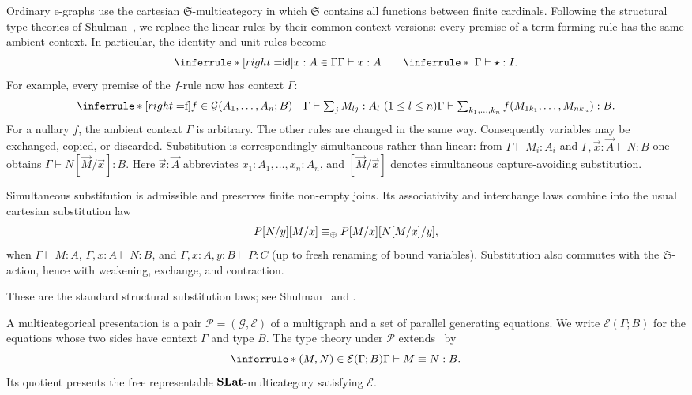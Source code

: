Ordinary e-graphs use the cartesian $\mathfrak S$-multicategory in which
$\mathfrak S$ contains all functions between finite cardinals.  Following the
structural type theories of Shulman~\cite{shulman2016categorical}, we replace
the linear rules by their common-context versions: every premise of a
term-forming rule has the same ambient context.  In particular, the identity
and unit rules become
\begin{equation}
\label{eq:cartesian_structure}
\inferrule*[right=$\id$]{x:A\in\Gamma}{\Gamma\vdash x:A}
\qquad
\inferrule*{\;}{\Gamma\vdash\star:\I}.
\end{equation}
For example, every premise of the $f$-rule now has context $\Gamma$:
\[
\inferrule*[right=$f$]
 {f\in\mathcal G(A_1,\ldots,A_n;B)\quad
  \Gamma\vdash\sum_j M_{lj}:A_l\ (1\leq l\leq n)}
 {\Gamma\vdash
  \sum_{k_1,\ldots,k_n}f(M_{1k_1},\ldots,M_{nk_n}):B}.
\]
For a nullary $f$, the ambient context $\Gamma$ is arbitrary.  The other rules
are changed in the same way.  Consequently variables may be
exchanged, copied, or discarded.  Substitution is correspondingly
simultaneous rather than linear: from
\(\Gamma\vdash M_i:A_i\) and
\(\Gamma,\vec x:\vec A\vdash N:B\) one obtains
\(\Gamma\vdash N[\vec M/\vec x]:B\).
Here $\vec x:\vec A$ abbreviates
$x_1:A_1,\ldots,x_n:A_n$, and $[\vec M/\vec x]$ denotes simultaneous
capture-avoiding substitution.

\begin{lemma}
\label{lemma:cartesian_substitution_main}
Simultaneous substitution is admissible and preserves finite non-empty joins.
Its associativity and interchange laws combine into the usual cartesian
substitution law
\[
P[N/y][M/x]\equiv_{\mathbin{\oplus}}P[M/x][N[M/x]/y],
\]
when $\Gamma\vdash M:A$, $\Gamma,x:A\vdash N:B$, and
$\Gamma,x:A,y:B\vdash P:C$ (up to fresh renaming of bound variables).
Substitution also commutes with the $\mathfrak S$-action, hence with
weakening, exchange, and contraction.
\end{lemma}
These are the standard structural substitution laws; see
Shulman~\cite{shulman2016categorical} and .

\begin{definition}[Presentations]
\label{def:type_theory_under_presentation}
A multicategorical presentation is a pair $\mathcal P=(\mathcal G,\mathcal E)$ of a multigraph and a set of parallel generating equations.  We write
$\mathcal E(\Gamma;B)$ for the equations whose two sides have context $\Gamma$
and type $B$.  The type theory under $\mathcal P$
extends~ by
\[
\inferrule*{(M,N)\in\mathcal E(\Gamma;B)}
{\Gamma\vdash M\equiv N:B}.
\]
Its quotient presents the free representable $\mathbf{SLat}$-multicategory satisfying $\mathcal E$.
\end{definition}

